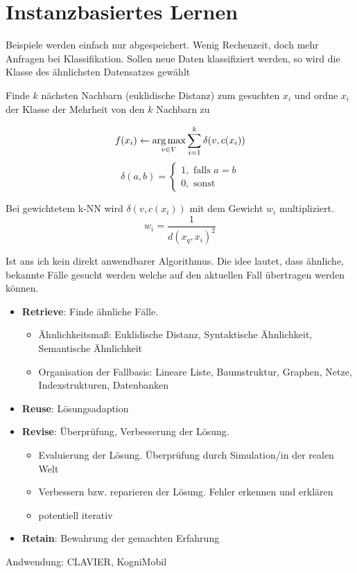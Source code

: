 \chapter{Instanzbasiertes Lernen}

Beispiele werden einfach nur abgespeichert. Wenig Rechenzeit, doch mehr
Anfragen bei Klassifikation. Sollen neue Daten klassifiziert werden, so wird die
Klasse des ähnlichsten Datensatzes gewählt

Finde $k$ nächsten Nachbarn (euklidische Distanz) zum gesuchten $x_i$ und ordne
$x_i$ der Klasse der Mehrheit von den $k$ Nachbarn zu

\begin{displaymath}
f(x_i) \leftarrow \operatorname*{arg\,max}_{v \in V} \sum_{i=1}^k \delta(v,c(x_i))
\end{displaymath}
\begin{equation}
    \delta(a,b) =
    \begin{cases}
        1, \text{ falls } a = b \\
        0, \text{ sonst}
    \end{cases}
\end{equation}

Bei gewichtetem k-NN wird $\delta(v,c(x_i))$ mit dem Gewicht $w_i$ multipliziert.
\begin{displaymath}
    w_i = \frac{1}{d(x_q,x_i)^2}
\end{displaymath}

Ist ans ich kein direkt anwendbarer Algorithmus. Die idee lautet, dass ähnliche,
bekannte Fälle gesucht werden welche auf den aktuellen Fall übertragen werden
können.
\begin{itemize}
    \item \textbf{Retrieve}: Finde ähnliche Fälle.
    \begin{itemize}
        \item Ähnlichkeitsmaß: Euklidische Distanz, Syntaktische Ähnlichkeit,
        Semantische Ähnlichkeit
        \item Organisation der Fallbasis: Lineare Liste, Baumstruktur, Graphen,
        Netze, Indexstrukturen, Datenbanken
    \end{itemize}
    \item \textbf{Reuse}: Lösungsadaption
    \item \textbf{Revise}: Überprüfung, Verbesserung der Lösung.
    \begin{itemize}
        \item Evaluierung der Lösung. Überprüfung durch Simulation/in der realen
        Welt
        \item Verbessern bzw. reparieren der Lösung. Fehler erkennen und erklären
        \item potentiell iterativ
    \end{itemize}
    \item \textbf{Retain}: Bewahrung der gemachten Erfahrung
\end{itemize}

Andwendung: CLAVIER, KogniMobil
